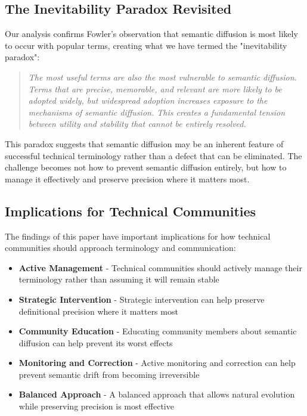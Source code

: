 \documentclass[11pt]{article}
\begin{document}
\subsection{The Inevitability Paradox Revisited}

Our analysis confirms Fowler's observation that semantic diffusion is most likely to occur with popular terms, creating what we have termed the "inevitability paradox":

\begin{quote}
\emph{The most useful terms are also the most vulnerable to semantic diffusion. Terms that are precise, memorable, and relevant are more likely to be adopted widely, but widespread adoption increases exposure to the mechanisms of semantic diffusion. This creates a fundamental tension between utility and stability that cannot be entirely resolved.}
\end{quote}

This paradox suggests that semantic diffusion may be an inherent feature of successful technical terminology rather than a defect that can be eliminated. The challenge becomes not how to prevent semantic diffusion entirely, but how to manage it effectively and preserve precision where it matters most.

\subsection{Implications for Technical Communities}

The findings of this paper have important implications for how technical communities should approach terminology and communication:

\begin{itemize}
\item \textbf{Active Management} - Technical communities should actively manage their terminology rather than assuming it will remain stable
\item \textbf{Strategic Intervention} - Strategic intervention can help preserve definitional precision where it matters most
\item \textbf{Community Education} - Educating community members about semantic diffusion can help prevent its worst effects
\item \textbf{Monitoring and Correction} - Active monitoring and correction can help prevent semantic drift from becoming irreversible
\item \textbf{Balanced Approach} - A balanced approach that allows natural evolution while preserving precision is most effective
\end{itemize}
\end{document}
